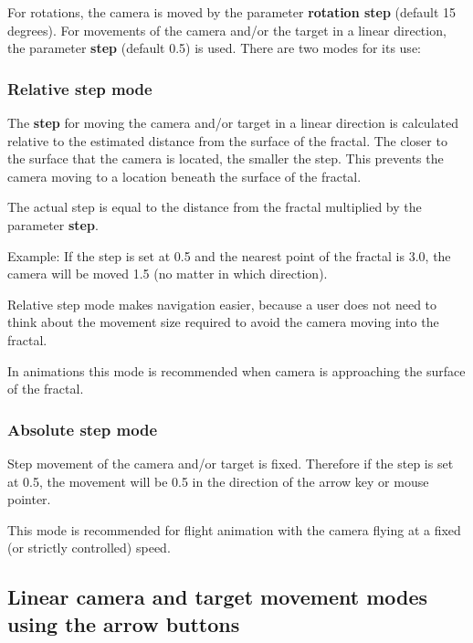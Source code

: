 For rotations, the camera is moved by the parameter \textbf{rotation step}
(default 15 degrees). For movements of the camera and/or the target in a linear
direction, the parameter \textbf{step} (default 0.5) is used. There are two
modes for its use:

\subsubsection{Relative step mode}\label{relative-step-mode}

The \textbf{step} for moving the camera and/or target in a linear direction is
calculated relative to the estimated distance from the surface of the fractal.
The closer to the surface that the camera is located, the smaller the step. This
prevents the camera moving to a location beneath the surface of the fractal.

The actual step is equal to the distance from the fractal multiplied by the
parameter \textbf{step}.

Example: If the step is set at 0.5 and the nearest point of the
fractal is 3.0, the camera will be moved 1.5 (no matter in which direction).

Relative step mode makes navigation easier, because a user does not need to think about the movement size required to avoid
the camera moving into the fractal.

In animations this mode is recommended when camera is approaching the surface of
the fractal.

\subsubsection{Absolute step mode}\label{absolute-step-mode}

Step movement of the camera and/or target is fixed. Therefore if the step is set
at 0.5, the movement will be 0.5 in the direction of the arrow key or mouse
pointer.

This mode is recommended for flight animation with the camera flying at a fixed (or strictly
controlled) speed.

\subsection{Linear camera and target movement modes using the arrow
	buttons}\label{linear-camera-and-target-movement-modes-using-the-arrow-buttons}

